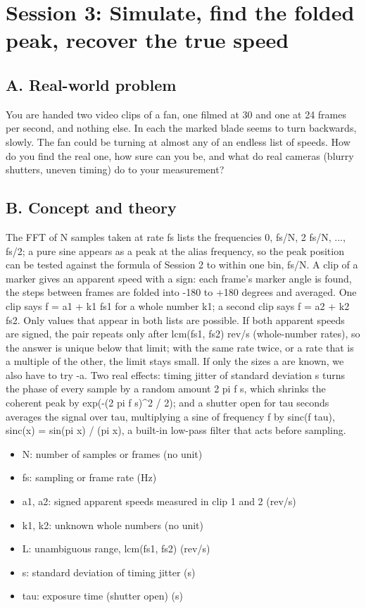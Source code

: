 \documentclass[11pt,a4paper]{article}
\begin{document}
\section{Session 3: Simulate, find the folded peak, recover the true speed}

\subsection*{A. Real-world problem}
You are handed two video clips of a fan, one filmed at 30 and one at 24 frames per second, and nothing else. In each the marked blade seems to turn backwards, slowly. The fan could be turning at almost any of an endless list of speeds. How do you find the real one, how sure can you be, and what do real cameras (blurry shutters, uneven timing) do to your measurement?

\subsection*{B. Concept and theory}
The FFT of N samples taken at rate fs lists the frequencies 0, fs/N, 2 fs/N, ..., fs/2; a pure sine appears as a peak at the alias frequency, so the peak position can be tested against the formula of Session 2 to within one bin, fs/N. A clip of a marker gives an apparent speed with a sign: each frame's marker angle is found, the steps between frames are folded into -180 to +180 degrees and averaged. One clip says f = a1 + k1 fs1 for a whole number k1; a second clip says f = a2 + k2 fs2. Only values that appear in both lists are possible. If both apparent speeds are signed, the pair repeats only after lcm(fs1, fs2) rev/s (whole-number rates), so the answer is unique below that limit; with the same rate twice, or a rate that is a multiple of the other, the limit stays small. If only the sizes \textbar{}a\textbar{} are known, we also have to try -a. Two real effects: timing jitter of standard deviation s turns the phase of every sample by a random amount 2 pi f s, which shrinks the coherent peak by exp(-(2 pi f s)\textasciicircum{}2 / 2); and a shutter open for tau seconds averages the signal over tau, multiplying a sine of frequency f by \textbar{}sinc(f tau)\textbar{}, sinc(x) = sin(pi x) / (pi x), a built-in low-pass filter that acts before sampling.

\begin{itemize}[nosep]
\item N: number of samples or frames (no unit)
\item fs: sampling or frame rate (Hz)
\item a1, a2: signed apparent speeds measured in clip 1 and 2 (rev/s)
\item k1, k2: unknown whole numbers (no unit)
\item L: unambiguous range, lcm(fs1, fs2) (rev/s)
\item s: standard deviation of timing jitter (s)
\item tau: exposure time (shutter open) (s)
\end{itemize}
\end{document}
